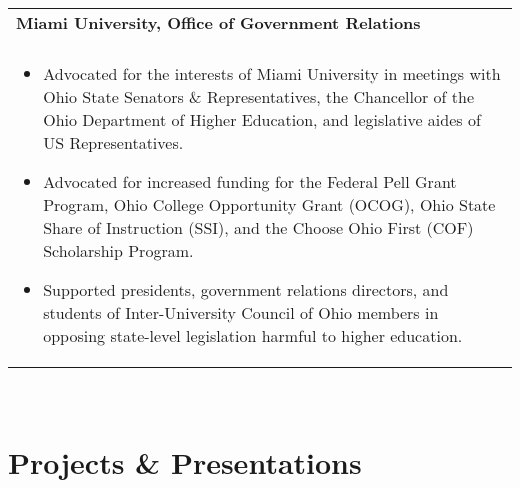 \documentclass[letterpaper,10pt]{article} %
\begin{document}
\begin{tabular*}{\linewidth}{@{\extracolsep{\fill}} lr }
\textbf{Miami University, Office of Government Relations} & \scriptsize\bfseries\color{sectioncolour}{Oxford, OH}\\
\footnotesize\bfseries\color{sectioncolour}{Government Relations Intern} & \scriptsize\bfseries\color{sectioncolour}{August 2021 - May 2024}\\
\multicolumn{2}{p{\linewidth}}{
    \scriptsize{\vspace{-0.1in}\begin{itemize}
        \item Advocated for the interests of Miami University in meetings with Ohio State Senators \& Representatives, the Chancellor of the Ohio Department of Higher Education, and legislative aides of US Representatives.
        \item Advocated for increased funding for the Federal Pell Grant Program, Ohio College Opportunity Grant (OCOG), Ohio State Share of Instruction (SSI), and the Choose Ohio First (COF) Scholarship Program.
        \item Supported presidents, government relations directors, and students of Inter-University Council of Ohio members in opposing state-level legislation harmful to higher education.
    \end{itemize}\vspace{-0.1in}}
}\\
\end{tabular*}\vspace{-0.1in}\\

\section{Projects \& Presentations}
\end{document}
